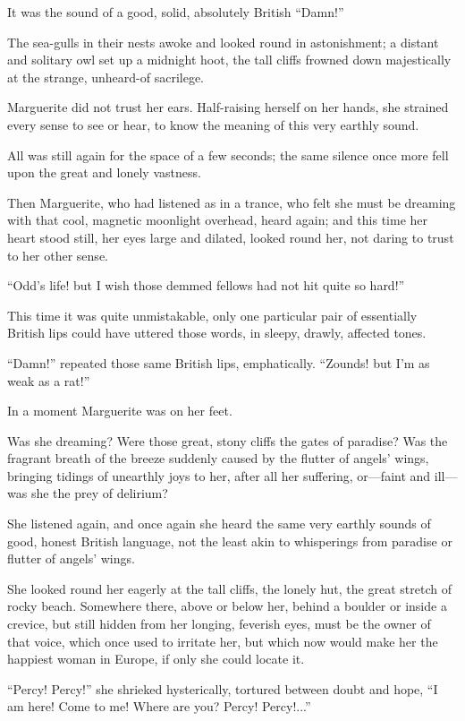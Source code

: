 \documentclass[paper=a5,BCOR=7mm,twoside,DIV=calc,12pt,usegeometry,chapterprefix,endperiod,headings=big]{scrbook}
\begin{document}
It was the sound of a good, solid, absolutely British \enquote{Damn!}

The sea-gulls in their nests awoke and looked round in astonishment; a distant and solitary owl set up a midnight hoot, the tall cliffs frowned down majestically at the strange, unheard-of sacrilege.

Marguerite did not trust her ears. Half-raising herself on her hands, she strained every sense to see or hear, to know the meaning of this very earthly sound.

All was still again for the space of a few seconds; the same silence once more fell upon the great and lonely vastness.

Then Marguerite, who had listened as in a trance, who felt she must be dreaming with that cool, magnetic moonlight overhead, heard again; and this time her heart stood still, her eyes large and dilated, looked round her, not daring to trust to her other sense.

\enquote{Odd's life! but I wish those demmed fellows had not hit quite so hard!}

This time it was quite unmistakable, only one particular pair of essentially British lips could have uttered those words, in sleepy, drawly, affected tones.

\enquote{Damn!} repeated those same British lips, emphatically. \enquote{Zounds! but I'm as weak as a rat!}

In a moment Marguerite was on her feet.

Was she dreaming? Were those great, stony cliffs the gates of paradise? Was the fragrant breath of the breeze suddenly caused by the flutter of angels’ wings, bringing tidings of unearthly joys to her, after all her suffering, or---faint and ill---was she the prey of delirium?

She listened again, and once again she heard the same very earthly sounds of good, honest British language, not the least akin to whisperings from paradise or flutter of angels’ wings.

She looked round her eagerly at the tall cliffs, the lonely hut, the great stretch of rocky beach. Somewhere there, above or below her, behind a boulder or inside a crevice, but still hidden from her longing, feverish eyes, must be the owner of that voice, which once used to irritate her, but which now would make her the happiest woman in Europe, if only she could locate it.

\enquote{Percy! Percy!} she shrieked hysterically, tortured between doubt and hope, \enquote{I am here! Come to me! Where are you? Percy! Percy!...}
\end{document}
